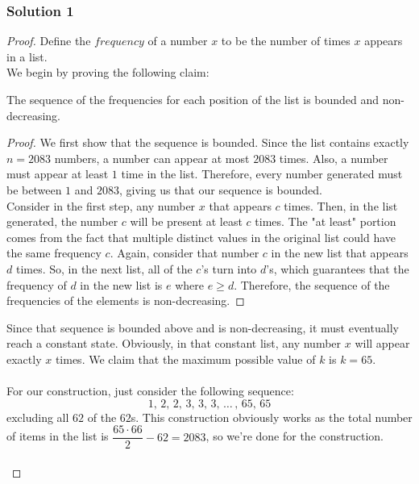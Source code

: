 \documentclass[11pt]{scrartcl}
\begin{document}
\bigskip

\subsubsection{Solution 1}

\begin{proof}
    Define the $frequency$ of a number $x$ to be the number of times $x$ appears 
    in a list. \\

    We begin by proving the following claim:
    \begin{claim}
        The sequence of the frequencies for each position of the list is bounded 
        and non-decreasing.
        \begin{proof}
            We first show that the sequence is bounded. Since the list contains
            exactly $n=2083$ numbers, a number can appear at most $2083$ times.
            Also, a number must appear at least $1$ time in the list. Therefore,
            every number generated must be between $1$ and $2083$, giving us that
            our sequence is bounded. \\

            Consider in the first step, any number $x$ that appears $c$ times. 
            Then, in the list generated, the number $c$ will be present at least 
            $c$ times. The "at least" portion comes from the fact that multiple 
            distinct values in the original list could have the same frequency 
            $c$. Again, consider that number $c$ in the new list that appears $d$ 
            times. So, in the next list, all of the $c$'s turn into $d$'s, which 
            guarantees that the frequency of $d$ in the new list is $e$ where
            $e \ge d$. Therefore, the sequence of the frequencies of the elements 
            is non-decreasing.
        \end{proof}
    \end{claim}

    Since that sequence is bounded above and is non-decreasing, it must 
    eventually reach a constant state. Obviously, in that constant list, 
    any number $x$ will appear exactly $x$ times. We claim that the maximum 
    possible value of $k$ is $k=65$. \\ \\

    For our construction, just consider the following sequence:
    \[
    1, \,2, \,2, \,3, \,3, \,3, \, \dots \,, \, 65, \, 65
    \]
    excluding all $62$ of the $62$s. This construction obviously works as the 
    total number of items in the list is $\dfrac{65 \cdot 66}{2} - 62 = 2083$,
    so we're done for the construction. \\ \\


\end{proof}
\end{document}
